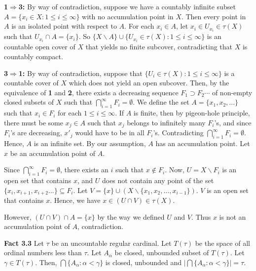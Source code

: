 \documentclass{article}
\begin{document}
\vskip 15pt




\textbf{1$\Rightarrow $3:} By way of contradiction, suppose we have a countably infinite subset $A=\{x_i\in X: 1\leq i \leq \infty\}$ with no accumulation point in $X$. Then every point in  $A$ is an isolated point with respect to $A$. For each $x_i\in A$, let $x_i \in U_{x_i}\in \tau(X)$ such that $U_{x_i} \cap A = \{x_i\}$. So $\{X\backslash A\} \cup \{U_{x_i} \in \tau(X): 1\leq i \leq \infty\}$ is an countable open cover of $X$ that yields no finite subcover, contradicting that $X$ is countably compact. 

\vskip 15pt


\textbf{3$\Rightarrow$1:} By way of contradiction, suppose that  $\{U_i\in \tau(X): 1\leq i\leq \infty\}$ is a countable cover of $X$ which does not yield an open subcover. Then, by the equivalence of \textbf{1} and \textbf{2}, there exists a decreasing sequence $F_1\supset F_2\cdots $ of non-empty closed subsets of $X$ such that $\bigcap_{i=1}^\infty F_i =\emptyset$. We define the set $A=\{x_1,x_2,...\}$ such that $x_i\in F_i$ for each $1\leq i\leq \infty$. If $A$ is finite, then by pigeon-hole principle, there must be some $x_j\in A$ such that $x_j$ belongs to infinitely many $F_i$'s, and since $F_i$'s are decreasing, $x'_j$ would have to be in all $F_i$'s. Contradicting $\bigcap_{i=1}^\infty F_i=\emptyset$. 
Hence, $A$ is an infinite set. By our assumption, $A$ has an accumulation point. Let $x$ be an accumulation point of $A$.

\vskip 10pt
Since $\bigcap_{i=1}^\infty F_i =\emptyset$, there exists an $i$ such that $x\notin F_i$. Now, $U=X\backslash F_i$ is an open set that contains $x$, and $U$ does not contain any point of the set $\{x_i,x_{i+1},x_{i+2}...\}\subseteq F_i$.  Let  $V=\{x\}\cup (X\backslash \{x_1,x_2,...,x_{i-1}\})$. $V$ is an open set that contains $x$. Hence, we have $x\in (U\cap V) \in \tau(X)$.

However, $(U\cap V)\cap A=\{x\}$ by the way we defined $U$ and $V$. Thus $x$ is not an accumulation point of $A$, contradiction.   

\vskip 40pt



\textbf{Fact 3.3} Let $\tau$ be an uncountable regular cardinal. Let $T(\tau)$ be the space 
of all ordinal numbers less than $\tau$. Let $A_\alpha$ be closed, unbounded subset of $T(\tau)$. Let $\gamma\in T(\tau).$ Then, $\bigcap \{A_\alpha : \alpha<\gamma\}$ is closed, unbounded and $\left| \bigcap \{A_\alpha: \alpha<\gamma\} \right|=\tau$.
\end{document}
